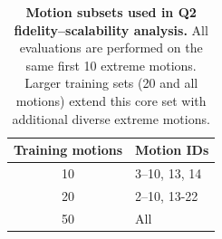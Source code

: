 \begin{table}[t]
\vspace{-1mm}
\centering
\footnotesize
\setlength{\tabcolsep}{6pt}
\renewcommand{\arraystretch}{1.15}
\caption{\textbf{Motion subsets used in Q2 fidelity--scalability analysis.}
All evaluations are performed on the same first 10 extreme motions.
Larger training sets (20 and all motions) extend this core set with additional
diverse extreme motions.}
\label{tab:q2_motion_ids}

\begin{tabularx}{\linewidth}{c|X}
\hline
Training motions & Motion IDs \\
\hline
10  & 3--10, 13, 14 \\
20  & 2--10, 13-22 \\
50  & All \\
\hline
\end{tabularx}
\vspace{-2mm}
\end{table}
